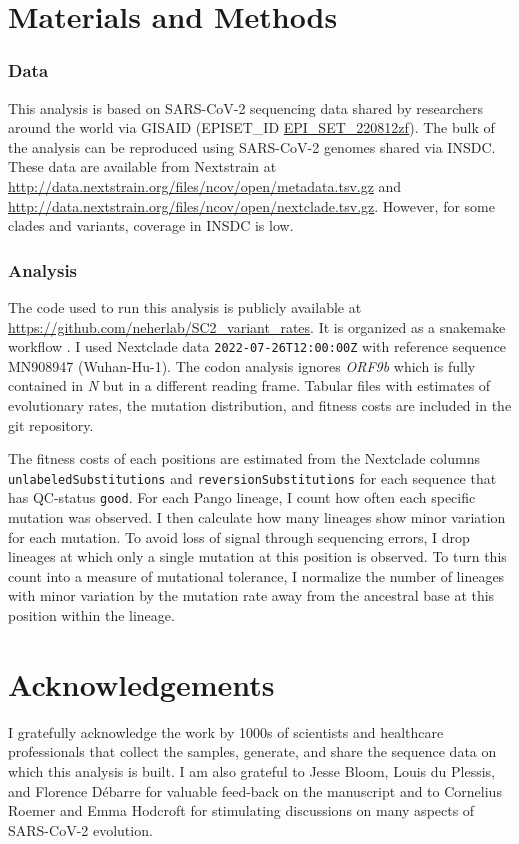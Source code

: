 \documentclass[aps,rmp, twocolumn]{revtex4}
\begin{document}
\section*{Materials and Methods}

\subsubsection*{Data}
This analysis is based on SARS-CoV-2 sequencing data shared by researchers around the world via GISAID \citep{shu_gisaid_2017} (EPISET\_ID \href{10.55876/gis8.220812zf}{EPI_SET_220812zf}).
The bulk of the analysis can be reproduced using SARS-CoV-2 genomes shared via INSDC.
These data are available from Nextstrain at \url{http://data.nextstrain.org/files/ncov/open/metadata.tsv.gz} and \url{http://data.nextstrain.org/files/ncov/open/nextclade.tsv.gz}.
However, for some clades and variants, coverage in INSDC is low.

\subsubsection*{Analysis}
The code used to run this analysis is publicly available at \url{https://github.com/neherlab/SC2_variant_rates}.
It is organized as a snakemake workflow \citep{koster_snakemakescalable_2012}.
I used Nextclade data \texttt{2022-07-26T12:00:00Z} with reference sequence MN908947 (Wuhan-Hu-1).
The codon analysis ignores \emph{ORF9b} which is fully contained in \emph{N} but in a different reading frame.
Tabular files with estimates of evolutionary rates, the mutation distribution, and fitness costs are included in the git repository.

The fitness costs of each positions are estimated from the Nextclade columns \texttt{unlabeledSubstitutions} and \texttt{reversionSubstitutions} for each sequence that has QC-status \texttt{good}.
For each Pango lineage, I count how often each specific mutation was observed.
I then calculate how many lineages show minor variation for each mutation.
To avoid loss of signal through sequencing errors, I drop lineages at which only a single mutation at this position is observed.
To turn this count into a measure of mutational tolerance, I normalize the number of lineages with minor variation by the mutation rate away from the ancestral base at this position within the lineage.

\section*{Acknowledgements}
I gratefully acknowledge the work by 1000s of scientists and healthcare professionals that collect the samples, generate, and share the sequence data on which this analysis is built.
I am also grateful to Jesse Bloom, Louis du Plessis, and Florence D\'ebarre for valuable feed-back on the manuscript and to Cornelius Roemer and Emma Hodcroft for stimulating discussions on many aspects of SARS-CoV-2 evolution.



\clearpage
\appendix

\clearpage
\onecolumngrid

% 
\end{document}
